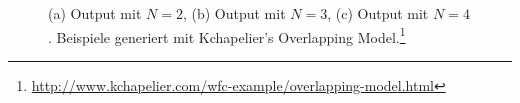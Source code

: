 \documentclass[12pt, a4paper,twoside,openany]{report} %
\begin{document}
\begin{figure}[H]
    \centering
    \qquad
    \qquad
    \caption[]{(a) Output mit $N = 2$, (b) Output mit $N = 3$, (c) Output mit $N = 4$. Beispiele generiert mit Kchapelier's Overlapping Model.\footnote[3]{\url{http://www.kchapelier.com/wfc-example/overlapping-model.html}}}
\end{figure}
\end{document}
